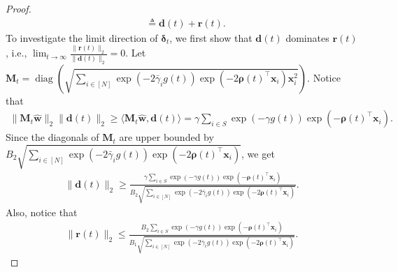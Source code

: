 \documentclass{article} %
\theoremstyle{plain}
\theoremstyle{definition}
\theoremstyle{remark}
\def\bigopen#1{\left(#1\right)}
\def\bdel{{\boldsymbol \delta}}
\def\bw{{\mathbf w}}
\def\bd{{\mathbf d}}
\def\bM{{\mathbf M}}
\DeclareMathOperator{\diag}{diag}
\begin{document}
\begin{proof}
\begin{align*}
        &\triangleq \mathbf{d}(t) + \mathbf{r}(t).
    \end{align*}
    To investigate the limit direction of $\bdel_t$, we first show that $\bd(t)$ dominates $\mathbf{r}(t)$, i.e., $\lim_{t \rightarrow \infty} \frac{\|\mathbf{r}(t)\|_2}{\|\mathbf{d}(t)\|_2} =0$. Let $\bM_t=\diag\bigopen{\sqrt{\sum_{i \in [N]}\exp(-2\bar{\gamma}_i g(t))\exp(-2\boldsymbol{\rho}(t)^\top \mathbf{x}_i) \mathbf{x}_i^2}}$. Notice that
    \begin{align*}
        \|\bM_t \hat{\bw}\|_2\|\bd(t)\|_2 \geq \langle \bM_t \hat{\bw}, \bd(t) \rangle = \gamma \sum_{i \in S}\exp(-\gamma g(t))\exp(-\boldsymbol{\rho}(t)^\top \mathbf{x}_i).
    \end{align*}
    Since the diagonals of $\bM_t$ are upper bounded by $B_2 \sqrt{\sum_{i \in [N]}\exp(-2\bar{\gamma}_i g(t))\exp(-2\boldsymbol{\rho}(t)^\top \mathbf{x}_i)}$, we get
    \begin{align*}
        \|\bd(t)\|_2 \geq \frac{\gamma \sum_{i \in S}\exp(-\gamma g(t))\exp(-\boldsymbol{\rho}(t)^\top \mathbf{x}_i)}{B_2 \sqrt{\sum_{i \in [N]}\exp(-2\bar{\gamma}_i g(t))\exp(-2\boldsymbol{\rho}(t)^\top \mathbf{x}_i)}}.
    \end{align*}
    Also, notice that
    \begin{align*}
        \|\mathbf{r}(t)\|_2 \leq \frac{B_2\sum_{i \in S}\exp(-\gamma g(t))\exp(-\boldsymbol{\rho}(t)^\top \mathbf{x}_i)}{B_1\sqrt{\sum_{i \in [N]}\exp(-2\bar{\gamma}_i g(t))\exp(-2\boldsymbol{\rho}(t)^\top \mathbf{x}_i)}}.
    \end{align*}


\end{proof}
\end{document}
